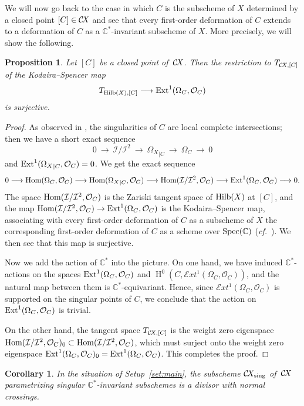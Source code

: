 \documentclass[10pt,a4paper]{article}
\numberwithin{equation}{section}
\newtheorem{corollary}[theorem]{Corollary}
\newtheorem{proposition}[theorem]{Proposition}
\theoremstyle{definition}
\theoremstyle{remark}
\DeclareMathOperator{\Spec}{Spec}
\DeclareMathOperator{\HH}{H}
\def\sing{\operatorname{sing}}
\def\C{{\mathbb C}}
\def\cI{{\mathcal I}}
\def\cO{{\mathcal{O}}}
\def\cExt{{\mathcal E}xt}
\def\operatorname#1{\mathop{\rm #1}\nolimits}
\def\Ext{\operatorname{Ext}}
\def\Hilb{\operatorname{Hilb}}
\def\Hom{\operatorname{Hom}}
\def\Hom{\operatorname{Hom}}
\def\Spec{\operatorname{Spec}}
\def\CX{\mathcal{C}\!X\hspace{-0.5pt}}
\newcommand{\shse}[3]{0 ~\lra ~#1~ \lra ~#2~ \lra ~#3~ \lra~ 0}
\newcommand\lra{\longrightarrow}
\begin{document}
We will now go back to the case in which $C$ is the subscheme of $X$ determined by a closed point $[C]\in \CX$ and see that every first-order deformation of  $C$ extends to a deformation of $C$ as a $\C^*$-invariant subscheme of $X$. More precisely, we will show the following. 

\begin{proposition}\label{prop:kodspen}
Let $[C]$ be a closed point of\, $\CX$. Then  the restriction to $T_{\CX,[C]}$ of the Kodaira--Spencer map 
\[
T_{\Hilb(X),[C]}\lra \Ext^1(\Omega_C,\cO_C)
\]
is surjective.
\end{proposition}

\begin{proof}
As observed in \cite[Proof of Proposition 6.4]{WORS6}, the singularities of $C$ are local complete intersections; then we have a short exact sequence
\begin{equation}\label{eq:ses1}
\shse{\cI/\cI^2}{{\Omega_X}_{|C}}{\Omega_C}
\end{equation}
and  $\Ext^1({\Omega_X}_{|C},\cO_C)=0$. 
We get the exact sequence 
\begin{multline}\label{eq:FP}
0\lra\Hom(\Omega_C,\cO_C)\lra\Hom({\Omega_X}_{|C},\cO_C)\lra \Hom(\cI/\cI^2,\cO_C)\lra \Ext^1(\Omega_C,\cO_C)\lra 0.
\end{multline}
The space $\Hom(\cI/\cI^2,\cO_C)$ is the Zariski tangent space of $\Hilb(X)$ at $[C]$, and the map $\Hom(\cI/\cI^2,\cO_C)\to \Ext^1(\Omega_C,\cO_C)$ is the Kodaira--Spencer map, associating  with every first-order deformation of $C$ as a subscheme of $X$ the corresponding first-order deformation of $C$ as a scheme over $\Spec(\C)$ (\textit{cf.}~\cite[Remark 2.4.4]{Ser1}). We then see that this map is surjective. 

Now we add the action of $\C^*$ into the picture. On one hand, we have induced $\C^*$-actions on the  spaces $\Ext^1(\Omega_C,\cO_C)$ and $\HH^0(C,\cExt^1(\Omega_C,\cO_C))$, and the natural map between them is $\C^*$-equivariant. Hence, since $\cExt^1(\Omega_C,\cO_C)$ is supported on the singular points of $C$, we conclude that the action on $\Ext^1(\Omega_C,\cO_C)$ is trivial.

 On the other hand, the tangent space $T_{\CX,[C]}$ is the weight zero eigenspace  $\Hom(\cI/\cI^2,\cO_C)_0\subset \Hom(\cI/\cI^2,\cO_C)$, which must surject onto the weight zero eigenspace $\Ext^1(\Omega_C,\cO_C)_0=\Ext^1(\Omega_C,\cO_C)$. This completes the proof.
\end{proof}

\begin{corollary}\label{cor:kodspen}
In the situation of Setup~\ref{set:main}, the subscheme $\CX_{\sing}$ of\, $\CX$ parametrizing singular $\C^*$-invariant subschemes is a divisor with normal crossings.
\end{corollary}
\end{document}
